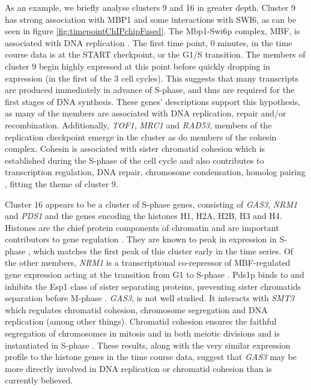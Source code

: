 \documentclass{bmcart}
\begin{document}
As an example, we briefly analyse clusters 9 and 16 in greater depth. Cluster 9 has strong association with MBP1 and some interactions with SWI6, as can be seen in figure \ref{fig:timepointChIPchipFused}. The Mbp1-Swi6p complex, MBF, is associated with DNA replication \citep{iyer2001genomic}. The first time point, 0 minutes, in the time course data is at the START checkpoint, or the G1/S transition. The members of cluster 9 begin highly expressed at this point before quickly dropping in expression (in the first of the 3 cell cycles). This suggests that many transcripts are produced immediately in advance of S-phase, and thus are required for the first stages of DNA synthesis. 
These genes' descriptions \citep[found using \texttt{org.Sc.sgd.db},][and shown in table 3 of the Supplementary Material]{carlson2014org} support this hypothesis, as many of the members are associated with DNA replication, repair and/or recombination. Additionally, \emph{TOF1}, \emph{MRC1} and \emph{RAD53}, members of the replication checkpoint \citep{bando2009csm3, lao2018yeast} emerge in the cluster as do members of the cohesin complex. Cohesin is associated with sister chromatid cohesion which is established during the S-phase of the cell cycle \citep{toth1999yeast} and also contributes to transcription regulation, DNA repair, chromosome condensation, homolog pairing \citep{mehta2013cohesin}, fitting the theme of cluster 9.

Cluster 16 appears to be a cluster of S-phase genes, consisting of \emph{GAS3}, \emph{NRM1} and \emph{PDS1} and the genes encoding the histones H1, H2A, H2B, H3 and H4. Histones are the chief protein components of chromatin \citep{fischle2003histone} and are important contributors to gene regulation \citep{bannister2011regulation}. They are known to peak in expression in S-phase \citep{granovskaia2010high}, which matches the first peak of this cluster early in the time series. Of the other members, \emph{NRM1} is a transcriptional co-repressor of MBF-regulated gene expression acting at the transition from G1 to S-phase \citep{de2006constraining, aligianni2009fission}. Pds1p binds to and inhibits the Esp1 class of sister separating proteins, preventing sister chromatids separation before M-phase \citep{ciosk1998esp1, toth1999yeast}. \emph{GAS3}, is not well studied. It interacts with \emph{SMT3} which regulates chromatid cohesion, chromosome segregation and DNA replication (among other things). Chromatid cohesion ensures the faithful segregation of chromosomes in mitosis and in both meiotic divisions \citep{cooper2009pds1p} and is instantiated in S-phase \citep{toth1999yeast}. These results, along with the very similar expression profile to the histone genes in the time course data, suggest that \emph{GAS3} may be more directly involved in DNA replication or chromatid cohesion than is currently believed.
\end{document}
